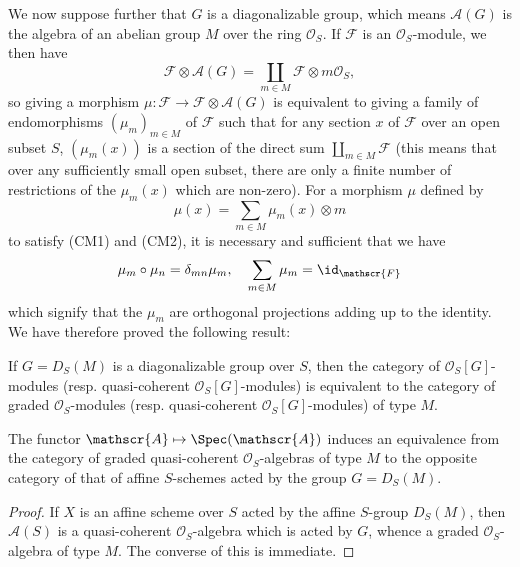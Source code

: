We now suppose further that $G$ is a diagonalizable group, which means $\mathscr{A}(G)$ is the algebra of an abelian group $M$ over the ring $\mathscr{O}_S$. If $\mathscr{F}$ is an $\mathscr{O}_S$-module, we then have
\[\mathscr{F}\otimes\mathscr{A}(G)=\coprod_{m\in M}\mathscr{F}\otimes m\mathscr{O}_S,\]
so giving a morphism $\mu:\mathscr{F}\to\mathscr{F}\otimes\mathscr{A}(G)$ is equivalent to giving a family of endomorphisms $(\mu_m)_{m\in M}$ of $\mathscr{F}$ such that for any section $x$ of $\mathscr{F}$ over an open subset $S$, $(\mu_m(x))$ is a section of the direct sum $\coprod_{m\in M}\mathscr{F}$ (this means that over any sufficiently small open subset, there are only a finite number of restrictions of the $\mu_m(x)$ which are non-zero). For a morphism $\mu$ defined by
\[\mu(x)=\sum_{m\in M}\mu_m(x)\otimes m\]
to satisfy (CM1) and (CM2), it is necessary and sufficient that we have 
\[\mu_m\circ\mu_n=\delta_{mn}\mu_m,\quad \sum_{m\in M}\mu_m=\id_\mathscr{F}\]
which signify that the $\mu_m$ are orthogonal projections adding up to the identity. We have therefore proved the following result:
\begin{proposition}\label{scheme module over diagonalizable group cat equivalent to graded module}
If $G=D_S(M)$ is a diagonalizable group over $S$, then the category of $\mathscr{O}_S[G]$-modules (resp. quasi-coherent $\mathscr{O}_S[G]$-modules) is equivalent to the category of graded $\mathscr{O}_S$-modules (resp. quasi-coherent $\mathscr{O}_S[G]$-modules) of type $M$.
\end{proposition}

\begin{corollary}\label{scheme affine acted by diagonalizable group equivalent to graded alg}
The functor $\mathscr{A}\mapsto\Spec(\mathscr{A})$ induces an equivalence from the category of graded quasi-coherent $\mathscr{O}_S$-algebras of type $M$ to the opposite category of that of affine $S$-schemes acted by the group $G=D_S(M)$.
\end{corollary}
\begin{proof}
If $X$ is an affine scheme over $S$ acted by the affine $S$-group $D_S(M)$, then $\mathscr{A}(S)$ is a quasi-coherent $\mathscr{O}_S$-algebra which is acted by $G$, whence a graded $\mathscr{O}_S$-algebra of type $M$. The converse of this is immediate.
\end{proof}

